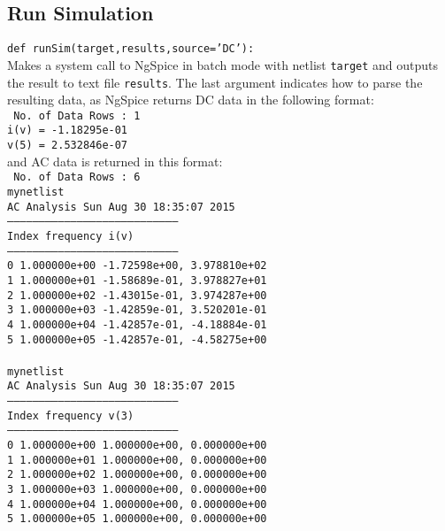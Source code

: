 \subsection{Run Simulation}
\texttt{def runSim(target,results,source='DC'):}\\
Makes a system call to NgSpice in batch mode with netlist \texttt{target} and outputs the result to text file \texttt{results}.
The last argument indicates how to parse the resulting data, as NgSpice returns DC data in the following format:\\
\texttt{
No. of Data Rows : 1\\
i(v) = -1.18295e-01\\
v(5) = 2.532846e-07}\\
and AC data is returned in this format:\\
\texttt{
No. of Data Rows : 6\\
                                   mynetlist\\
                                   AC Analysis  Sun Aug 30 18:35:07  2015\\
--------------------------------------------------------------------------------\\
Index   frequency       i(v)                            \\
--------------------------------------------------------------------------------\\
0	1.000000e+00	-1.72598e+00,	3.978810e+02	\\
1	1.000000e+01	-1.58689e-01,	3.978827e+01	\\
2	1.000000e+02	-1.43015e-01,	3.974287e+00	\\
3	1.000000e+03	-1.42859e-01,	3.520201e-01	\\
4	1.000000e+04	-1.42857e-01,	-4.18884e-01	\\
5	1.000000e+05	-1.42857e-01,	-4.58275e+00	\\
\\
                                   mynetlist\\
                                   AC Analysis  Sun Aug 30 18:35:07  2015\\
--------------------------------------------------------------------------------\\
Index   frequency       v(3)                            \\
--------------------------------------------------------------------------------\\
0	1.000000e+00	1.000000e+00,	0.000000e+00	\\
1	1.000000e+01	1.000000e+00,	0.000000e+00	\\
2	1.000000e+02	1.000000e+00,	0.000000e+00	\\
3	1.000000e+03	1.000000e+00,	0.000000e+00	\\
4	1.000000e+04	1.000000e+00,	0.000000e+00	\\
5	1.000000e+05	1.000000e+00,	0.000000e+00\\
}

